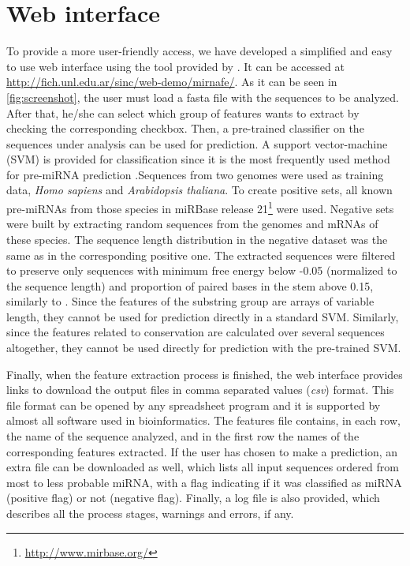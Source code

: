 \documentclass{article}
\begin{document}
\section{Web interface}
To provide a more user-friendly access, we have developed a simplified and easy to use web interface using the tool provided by \cite{Stegmayer15}. It can be
accessed at \url{http://fich.unl.edu.ar/sinc/web-demo/mirnafe/}. As it can be seen in \autoref{fig:screenshot}, the user must load a fasta file with the
sequences to be analyzed. After that, he/she can select which group of features wants to extract by checking the corresponding checkbox. Then, a pre-trained
classifier on the sequences under analysis can be used for prediction. A support vector-machine (SVM) is provided for classification since it is the most
frequently used method for pre-miRNA prediction \citep{Kleftogiannis13}.Sequences from two genomes were used as training data, \textit{Homo sapiens} and
\textit{Arabidopsis thaliana}. To create positive sets, all known pre-miRNAs from those species in miRBase release 21\footnote{\url{http://www.mirbase.org/}}
\citep{Kozomara14} were used. Negative sets were built by extracting random sequences from the genomes and mRNAs of these species. The sequence length
distribution in the negative dataset was the same as in the corresponding positive one. The extracted sequences were filtered to preserve only sequences with
minimum free energy below -0.05 (normalized to the sequence length) and proportion of paired bases in the stem above 0.15, similarly to \cite{Gudys13}. Since
the features of the substring group are arrays of variable length, they cannot be used for prediction directly in a standard SVM. Similarly, since the features
related to conservation are calculated over several sequences altogether, they cannot be used directly for prediction with the pre-trained SVM.

Finally, when the feature extraction process is finished, the web interface provides links to download the output files in comma separated values
(\textit{csv}) format. This file format can be opened by any spreadsheet program and it is supported by almost all software used in bioinformatics. The
features file contains, in each row, the name of the sequence analyzed, and in the first row the names of the corresponding features extracted. If the user has
chosen to make a prediction, an extra file can be downloaded as well, which lists all input sequences ordered from most to less probable miRNA, with a flag
indicating if it was classified as miRNA (positive flag) or not (negative flag). Finally, a log file is also provided, which describes all the process stages,
warnings and errors, if any.
\end{document}
